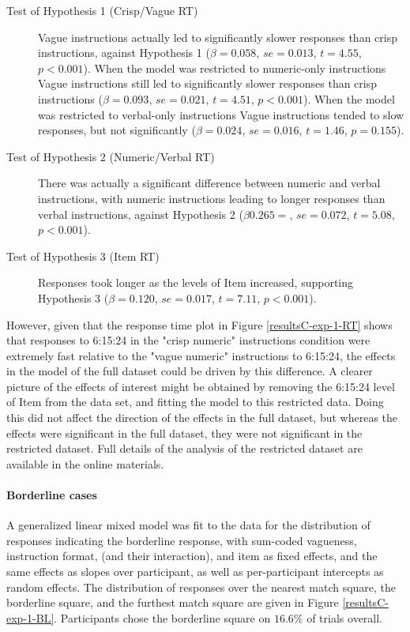 \begin{description}
	\item [Test of Hypothesis 1 (Crisp/Vague RT)] Vague instructions actually led to significantly slower responses than crisp instructions, against Hypothesis 1 ($\beta=0.058$, $se=0.013$, $t=4.55$, $p<0.001$). When the model was restricted to numeric-only instructions Vague instructions still led to significantly slower responses than crisp instructions ($\beta=0.093$, $se=0.021$, $t=4.51$, $p<0.001$). When the model was restricted to verbal-only instructions Vague instructions tended to slow responses, but not significantly ($\beta=0.024$, $se=0.016$, $t=1.46$, $p=0.155$).
	\item [Test of Hypothesis 2 (Numeric/Verbal RT)] There was actually a significant difference between numeric and verbal instructions, with numeric instructions leading to longer responses than verbal instructions, against Hypothesis 2 ($\beta0.265=$, $se=0.072$, $t=5.08$, $p<0.001$).
	\item [Test of Hypothesis 3 (Item RT)] Responses took longer as the levels of Item increased, supporting Hypothesis 3 ($\beta=0.120$, $se=0.017$, $t=7.11$, $p<0.001$).
\end{description}

However, given that the response time plot in Figure \ref{resultsC-exp-1-RT} shows that responses to 6:15:24 in the "crisp numeric" instructions condition were extremely fast relative to the "vague numeric" instructions to 6:15:24, the effects in the model of the full dataset could be driven by this difference. A clearer picture of the effects of interest might be obtained by removing the 6:15:24 level of Item from the data set, and fitting the model to this restricted data. Doing this did not affect the direction of the effects in the full dataset, but whereas the effects were significant in the full dataset, they were not significant in the restricted dataset. Full details of the analysis of the restricted dataset are available in the online materials.

\paragraph{\textbf{Borderline cases}}

A generalized linear mixed model \citet{jaeger2008categorical} was fit to the data for the distribution of responses indicating the borderline response, with sum-coded vagueness, instruction format, (and their interaction), and item as fixed effects, and the same effects as slopes over participant, as well as per-participant intercepts as random effects. The distribution of responses over the nearest match square, the borderline square, and the furthest match square are given in Figure \ref{resultsC-exp-1-BL}. Participants chose the borderline square on $16.6\%$ of trials overall.

